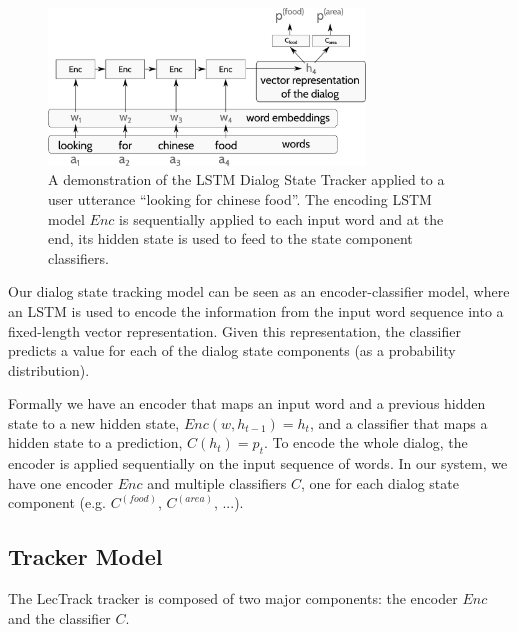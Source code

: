 \documentclass[10pt,twocolumn]{article}
\begin{document}
\begin{figure}
\center
\includegraphics[width=0.75\textwidth]{arch}
\caption{A demonstration of the LSTM Dialog State Tracker applied to a user utterance ``looking for chinese food''. The encoding LSTM model $Enc$ is sequentially applied to each input word and at the end, its hidden state is used to feed to the state component classifiers.}
\label{fig:LecTrack}
\end{figure}


Our dialog state tracking model can be seen as an encoder-classifier model, where an LSTM is used to encode the information from the input word sequence into a fixed-length vector representation. Given this representation, the classifier predicts a value for each of the dialog state components (as a probability distribution).

Formally we have an encoder that maps an input word and a previous hidden state to a new hidden state, $Enc(w, h_{t-1})=h_t$, and a classifier that maps a hidden state to a prediction, $C(h_t)=p_t$. To encode the whole dialog, the encoder is applied sequentially on the input sequence of words. In our system, we have one encoder $Enc$ and multiple classifiers $C$, one for each dialog state component (e.g. $C^{(food)}$, $C^{(area)}$, ...).


\subsection{Tracker Model}
The LecTrack tracker is composed of two major components: the encoder $Enc$ and the classifier $C$.
\end{document}

